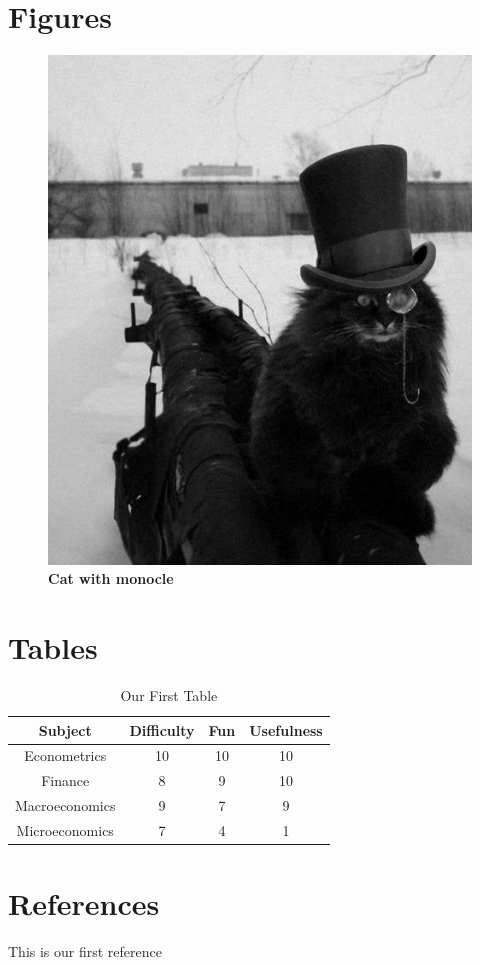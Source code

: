 \documentclass[a4paper, 12pt]{article}
\begin{document}
\section{Figures}
\begin{figure}[!ht]
\begin{center}
\caption{\color{red}\textbf{Cat with monocle}}
\includegraphics[scale=0.3]{cat}
\end{center}
\end{figure}
\newpage
\section{Tables}
\begin{center}
\begin{table}[!h]
\caption{Our First Table}
\begin{tabular}[!h]{c | c | c | c }
Subject & Difficulty & Fun & Usefulness\\ \hline
Econometrics & 10 & 10 & 10\\
Finance & 8 & 9 & 10\\
Macroeconomics & 9 & 7 & 9\\
Microeconomics & 7 & 4 & 1\\
\end{tabular}
\end{table}
\end{center}
\section{References}
 
This is our first reference \cite{OlmoPouliot}

\end{document}
